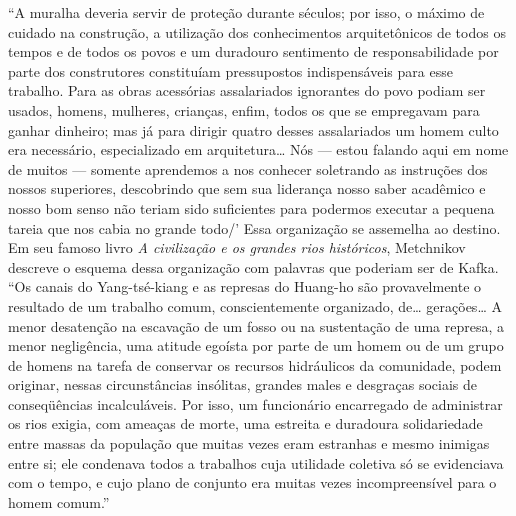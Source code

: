 ``A muralha deveria servir de proteção durante séculos; por isso, o
máximo de cuidado na construção, a utilização dos conhecimentos
arquitetônicos de todos os tempos e de todos os povos e um duradouro
sentimento de responsabilidade por parte dos construtores constituíam
pressupostos indispensáveis para esse trabalho. Para as obras acessórias
assalariados ignorantes do povo podiam ser usados, homens, mulheres,
crianças, enfim, todos os que se empregavam para ganhar dinheiro; mas já
para dirigir quatro desses assalariados um homem culto era necessário,
especializado em arquitetura\ldots{} Nós --- estou falando aqui em nome de
muitos --- somente aprendemos a nos conhecer soletrando as instruções
dos nossos superiores, descobrindo que sem sua liderança nosso saber
acadêmico e nosso bom senso não teriam sido suficientes para podermos
executar a pequena tareia que nos cabia no grande todo/' Essa
organização se assemelha ao destino. Em seu famoso livro \textit{A civilização
e os grandes rios históricos}, Metchnikov descreve o esquema dessa
organização com palavras que poderiam ser de Kafka. ``Os canais do
Yang-tsé-kiang e as represas do Huang-ho são provavelmente o resultado
de um trabalho comum, conscientemente organizado, de\ldots{} gerações\ldots{} A
menor desatenção na escavação de um fosso ou na sustentação de uma
represa, a menor negligência, uma atitude egoísta por parte de um homem
ou de um grupo de homens na tarefa de conservar os recursos hidráulicos
da comunidade, podem originar, nessas circunstâncias insólitas, grandes
males e desgraças sociais de conseqüências incalculáveis. Por isso, um
funcionário encarregado de administrar os rios exigia, com ameaças de
morte, uma estreita e duradoura solidariedade entre massas da população
que muitas vezes eram estranhas e mesmo inimigas entre si; ele condenava
todos a trabalhos cuja utilidade coletiva só se evidenciava com o tempo,
e cujo plano de conjunto era muitas vezes incompreensível para o homem
comum.''


